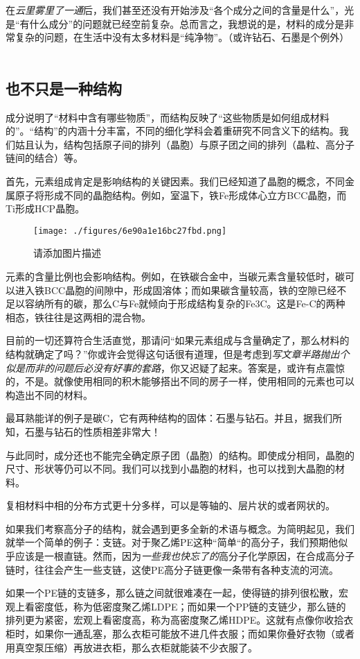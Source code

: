 在\textsl{云里雾里了一通}后，我们甚至还没有开始涉及“各个成分之间的含量是什么”，光是“有什么成分”的问题就已经空前复杂。总而言之，我想说的是，材料的成分是非常复杂的问题，在生活中没有太多材料是“纯净物”。（或许钻石、石墨是个例外）
 
\subsection{也不只是一种结构}
成分说明了“材料中含有哪些物质”，而结构反映了“这些物质是如何组成材料的”。“结构”的内涵十分丰富，不同的细化学科会着重研究不同含义下的结构。我们姑且认为，结构包括原子间的排列（晶胞）与原子团之间的排列（晶粒、高分子链间的结合）等。

首先，元素组成肯定是影响结构的关键因素。我们已经知道了晶胞的概念，不同金属原子将形成不同的晶胞结构。例如，室温下，铁Fe形成体心立方BCC晶胞，而Ti形成HCP晶胞。
\begin{figure}[ht]
\centering
\texttt{[image: ./figures/6e90a1e16bc27fbd.png]}
\caption{请添加图片描述} \label{fig_MSEINT_1}
\end{figure}
元素的含量比例也会影响结构。例如，在铁碳合金中，当碳元素含量较低时，碳可以进入铁BCC晶胞的间隙中，形成固溶体；而如果碳含量较高，铁的空隙已经不足以容纳所有的碳，那么C与Fe就倾向于形成结构复杂的Fe3C。这是Fe-C的两种相态，铁往往是这两相的混合物。


目前的一切还算符合生活直觉，那请问“如果元素组成与含量确定了，那么材料的结构就确定了吗？”你或许会觉得这句话很有道理，但是考虑到\textsl{写文章半路抛出个似是而非的问题后必没有好事的套路}，你又迟疑了起来。答案是，或许有点震惊的，不是。就像使用相同的积木能够搭出不同的房子一样，使用相同的元素也可以构造出不同的材料。

最耳熟能详的例子是碳C，它有两种结构的固体：石墨与钻石。并且，据我们所知，石墨与钻石的性质相差非常大！

与此同时，成分还也不能完全确定原子团（晶胞）的结构。即使成分相同，晶胞的尺寸、形状等仍可以不同。我们可以找到小晶胞的材料，也可以找到大晶胞的材料。 

复相材料中相的分布方式更十分多样，可以是等轴的、层片状的或者网状的。

如果我们考察高分子的结构，就会遇到更多全新的术语与概念。为简明起见，我们就举一个简单的例子：支链。对于聚乙烯PE这种“简单“的高分子，我们预期他似乎应该是一根直链。然而，因为\textsl{一些我也快忘了的}高分子化学原因，在合成高分子链时，往往会产生一些支链，这使PE高分子链更像一条带有各种支流的河流。

如果一个PE链的支链多，那么链之间就很难凑在一起，使得链的排列很松散，宏观上看密度低，称为低密度聚乙烯LDPE；而如果一个PP链的支链少，那么链的排列更为紧密，宏观上看密度高，称为高密度聚乙烯HDPE。这就有点像你收拾衣柜时，如果你一通乱塞，那么衣柜可能放不进几件衣服；而如果你叠好衣物（或者用真空泵压缩）再放进衣柜，那么衣柜就能装不少衣服了。

